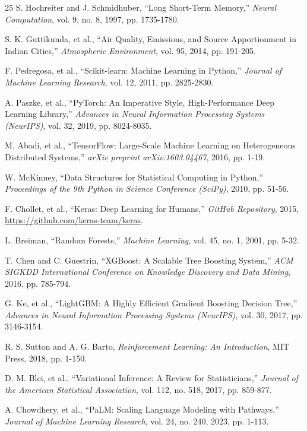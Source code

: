 \documentclass[conference]{IEEEtran}
\begin{document}
\begin{thebibliography}{25}
S. Hochreiter and J. Schmidhuber, ``Long Short-Term Memory,'' \textit{Neural Computation}, vol. 9, no. 8, 1997, pp. 1735-1780.

S. K. Guttikunda, et al., ``Air Quality, Emissions, and Source Apportionment in Indian Cities,'' \textit{Atmospheric Environment}, vol. 95, 2014, pp. 191-205.

F. Pedregosa, et al., ``Scikit-learn: Machine Learning in Python,'' \textit{Journal of Machine Learning Research}, vol. 12, 2011, pp. 2825-2830.

A. Paszke, et al., ``PyTorch: An Imperative Style, High-Performance Deep Learning Library,'' \textit{Advances in Neural Information Processing Systems (NeurIPS)}, vol. 32, 2019, pp. 8024-8035.

M. Abadi, et al., ``TensorFlow: Large-Scale Machine Learning on Heterogeneous Distributed Systems,'' \textit{arXiv preprint arXiv:1603.04467}, 2016, pp. 1-19.

W. McKinney, ``Data Structures for Statistical Computing in Python,'' \textit{Proceedings of the 9th Python in Science Conference (SciPy)}, 2010, pp. 51-56.

F. Chollet, et al., ``Keras: Deep Learning for Humans,'' \textit{GitHub Repository}, 2015, \url{https://github.com/keras-team/keras}.

L. Breiman, ``Random Forests,'' \textit{Machine Learning}, vol. 45, no. 1, 2001, pp. 5-32.

T. Chen and C. Guestrin, ``XGBoost: A Scalable Tree Boosting System,'' \textit{ACM SIGKDD International Conference on Knowledge Discovery and Data Mining}, 2016, pp. 785-794.

G. Ke, et al., ``LightGBM: A Highly Efficient Gradient Boosting Decision Tree,'' \textit{Advances in Neural Information Processing Systems (NeurIPS)}, vol. 30, 2017, pp. 3146-3154.

R. S. Sutton and A. G. Barto, \textit{Reinforcement Learning: An Introduction}, MIT Press, 2018, pp. 1-150.

D. M. Blei, et al., ``Variational Inference: A Review for Statisticians,'' \textit{Journal of the American Statistical Association}, vol. 112, no. 518, 2017, pp. 859-877.

A. Chowdhery, et al., ``PaLM: Scaling Language Modeling with Pathways,'' \textit{Journal of Machine Learning Research}, vol. 24, no. 240, 2023, pp. 1-113.
\end{thebibliography}
\end{document}
